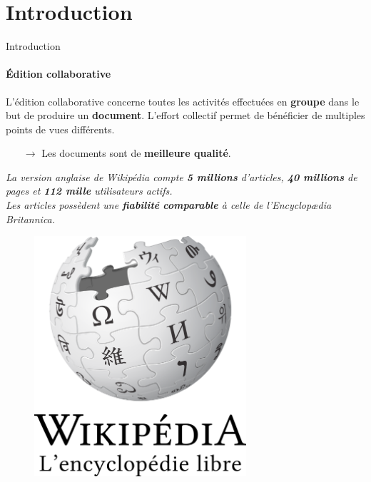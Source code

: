 \section{Introduction}


\begin{frame}{Introduction}\framesubtitle{Édition collaborative}

  L'édition collaborative concerne toutes les activités effectuées en
  \textbf{groupe} dans le but de produire un \textbf{document}. L'effort
  collectif permet de bénéficier de multiples points de vues différents.

  \begin{itemize}
  \item[$\rightarrow$] Les documents sont de \textbf{meilleure qualité}.
  \end{itemize}
  
  \vspace{1cm}

  \begin{minipage}{0.6\textwidth}
    \textit{La version anglaise de Wikipédia compte \textbf{5 millions}
      d'articles, \textbf{40 millions} de pages et \textbf{112 mille}
      utilisateurs actifs.\vspace{0.15cm}\\Les articles possèdent une
      \textbf{fiabilité} \textbf{comparable} à celle de l'Encyclopædia
      Britannica.}
  \end{minipage}
  \hfill
  \begin{minipage}{0.3\textwidth}
    \begin{figure}
      \begin{center}
        \includegraphics[width=0.7\textwidth]{img/wikipedia.png}
      \end{center}
    \end{figure}
  \end{minipage}

\end{frame}


